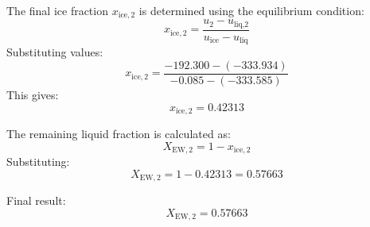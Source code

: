 The final ice fraction \( x_{\text{ice},2} \) is determined using the equilibrium condition:  
\[
x_{\text{ice},2} = \frac{u_2 - u_{\text{liq,2}}}{u_{\text{ice}} - u_{\text{liq}}}
\]  
Substituting values:  
\[
x_{\text{ice},2} = \frac{-192.300 - (-333.934)}{-0.085 - (-333.585)}
\]  
This gives:  
\[
x_{\text{ice},2} = 0.42313
\]  

The remaining liquid fraction is calculated as:  
\[
X_{\text{EW},2} = 1 - x_{\text{ice},2}
\]  
Substituting:  
\[
X_{\text{EW},2} = 1 - 0.42313 = 0.57663
\]  

Final result:  
\[
X_{\text{EW},2} = 0.57663
\]